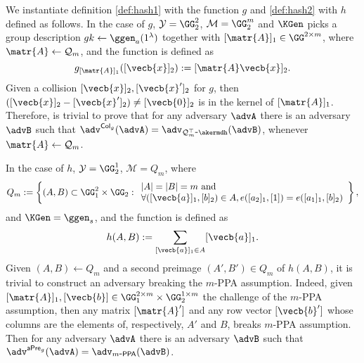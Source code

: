 We instantiate definition \ref{def:hash1} with the function $g$ and \ref{def:hash2}  with $h$ defined as follows. In the case of $g$, $\mathcal{Y}=\GG_2^2$, $\mathcal{M}=\GG_2^m$ and $\KGen$ picks a group description $gk\gets\ggen_a(1^\lambda)$ together with $[\matr{A}]_1\in\GG^{2\times m}$, where $\matr{A}\gets\mathcal{Q}_m$, and the function is defined as
$$
g_{[\matr{A}]_1}([\vecb{x}]_2):= [\matr{A}\vecb{x}]_2.
$$
Given a collision $[\vecb{x}]_2,[\vecb{x}']_2$ for $g$, then $([\vecb{x}]_2-[\vecb{x}']_2)\neq [\vecb{0}]_2$ is in the kernel of $[\matr{A} ]_1$. Therefore, is trivial to prove that for any adversary $\advA$ there is an adversary $\advB$ such that $\adv^{\mathsf{Col}_g}(\advA)=\adv_{\mathcal{Q}_m^\top\mbox{-}\akermdh}(\advB)$, whenever $\matr{A}\gets\mathcal{Q}_m$.


In the case of $h$, $\mathcal{Y}=\GG_2^1$, $\mathcal{M}=Q_m$, where
$$
Q_m := \left\{
(A,B)\subset\GG_1^{2}\times\GG_2:
\begin{array}{l} 
{|A|=|B|=m\text{ and }}\\
{\forall ([\vecb{a}]_1,[b]_2)\in A,e([a_2]_1,[1])=e([a_1]_1,[b]_2)}
\end{array}
\right\},
$$ and $\KGen=\ggen_s$, and the function is defined as
$$
h(A,B):= \sum_{[\vecb{a}]_1\in A}[\vecb{a}]_1.
$$
Given $(A,B)\gets Q_m$ and a second preimage $(A',B')\in Q_m$ of $h(A,B)$, it is trivial to construct an adversary breaking the $m$-PPA assumption. Indeed, given $[\matr{A}]_1,[\vecb{b}]\in\GG_1^{2\times m}\times \GG_2^{1\times m}$ the challenge of the $m$-PPA assumption, then any matrix $[\matr{A}']$ and any row vector $[\vecb{b}']$ whose columns are the elements of, respectively, $A'$ and $B$, breaks $m$-PPA assumption. Then for any adversary $\advA$ there is an adversary $\advB$ such that $\adv^{\mathsf{aPre}_g}(\advA)=\adv_{m\mbox{-}\mathsf{PPA}}(\advB)$.

